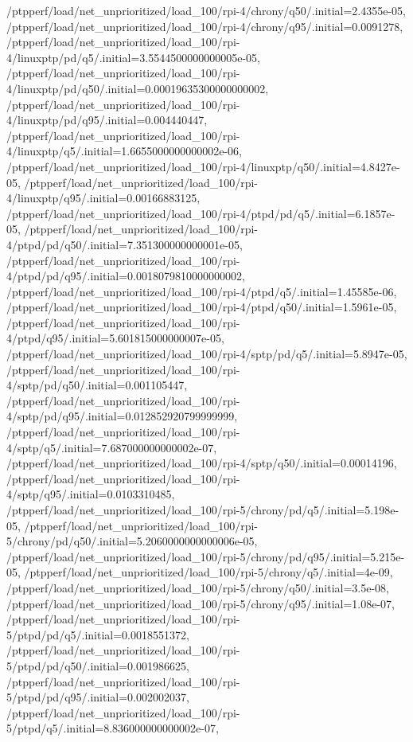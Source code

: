 {    /ptpperf/load/net_unprioritized/load_100/rpi-4/chrony/q50/.initial=2.4355e-05,
    /ptpperf/load/net_unprioritized/load_100/rpi-4/chrony/q95/.initial=0.0091278,
    /ptpperf/load/net_unprioritized/load_100/rpi-4/linuxptp/pd/q5/.initial=3.5544500000000005e-05,
    /ptpperf/load/net_unprioritized/load_100/rpi-4/linuxptp/pd/q50/.initial=0.00019635300000000002,
    /ptpperf/load/net_unprioritized/load_100/rpi-4/linuxptp/pd/q95/.initial=0.004440447,
    /ptpperf/load/net_unprioritized/load_100/rpi-4/linuxptp/q5/.initial=1.6655000000000002e-06,
    /ptpperf/load/net_unprioritized/load_100/rpi-4/linuxptp/q50/.initial=4.8427e-05,
    /ptpperf/load/net_unprioritized/load_100/rpi-4/linuxptp/q95/.initial=0.00166883125,
    /ptpperf/load/net_unprioritized/load_100/rpi-4/ptpd/pd/q5/.initial=6.1857e-05,
    /ptpperf/load/net_unprioritized/load_100/rpi-4/ptpd/pd/q50/.initial=7.351300000000001e-05,
    /ptpperf/load/net_unprioritized/load_100/rpi-4/ptpd/pd/q95/.initial=0.0018079810000000002,
    /ptpperf/load/net_unprioritized/load_100/rpi-4/ptpd/q5/.initial=1.45585e-06,
    /ptpperf/load/net_unprioritized/load_100/rpi-4/ptpd/q50/.initial=1.5961e-05,
    /ptpperf/load/net_unprioritized/load_100/rpi-4/ptpd/q95/.initial=5.601815000000007e-05,
    /ptpperf/load/net_unprioritized/load_100/rpi-4/sptp/pd/q5/.initial=5.8947e-05,
    /ptpperf/load/net_unprioritized/load_100/rpi-4/sptp/pd/q50/.initial=0.001105447,
    /ptpperf/load/net_unprioritized/load_100/rpi-4/sptp/pd/q95/.initial=0.012852920799999999,
    /ptpperf/load/net_unprioritized/load_100/rpi-4/sptp/q5/.initial=7.687000000000002e-07,
    /ptpperf/load/net_unprioritized/load_100/rpi-4/sptp/q50/.initial=0.00014196,
    /ptpperf/load/net_unprioritized/load_100/rpi-4/sptp/q95/.initial=0.0103310485,
    /ptpperf/load/net_unprioritized/load_100/rpi-5/chrony/pd/q5/.initial=5.198e-05,
    /ptpperf/load/net_unprioritized/load_100/rpi-5/chrony/pd/q50/.initial=5.2060000000000006e-05,
    /ptpperf/load/net_unprioritized/load_100/rpi-5/chrony/pd/q95/.initial=5.215e-05,
    /ptpperf/load/net_unprioritized/load_100/rpi-5/chrony/q5/.initial=4e-09,
    /ptpperf/load/net_unprioritized/load_100/rpi-5/chrony/q50/.initial=3.5e-08,
    /ptpperf/load/net_unprioritized/load_100/rpi-5/chrony/q95/.initial=1.08e-07,
    /ptpperf/load/net_unprioritized/load_100/rpi-5/ptpd/pd/q5/.initial=0.0018551372,
    /ptpperf/load/net_unprioritized/load_100/rpi-5/ptpd/pd/q50/.initial=0.001986625,
    /ptpperf/load/net_unprioritized/load_100/rpi-5/ptpd/pd/q95/.initial=0.002002037,
    /ptpperf/load/net_unprioritized/load_100/rpi-5/ptpd/q5/.initial=8.836000000000002e-07,
}
